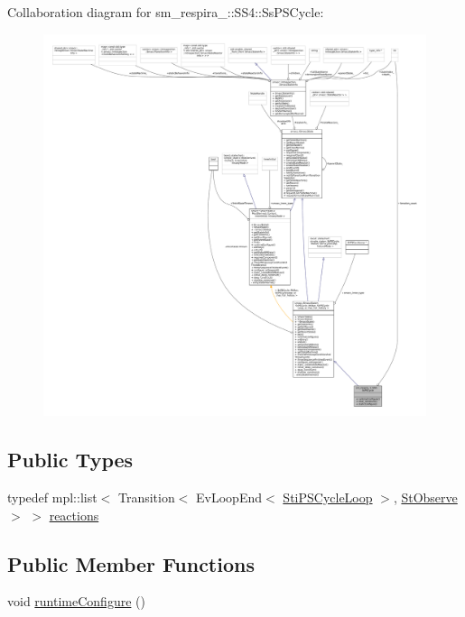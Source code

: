 Collaboration diagram for sm\+\_\+respira\+\_\+:\+:S\+S4\+:\+:Ss\+P\+S\+Cycle\+:
\nopagebreak
\begin{figure}[H]
\begin{center}
\leavevmode
\includegraphics[width=350pt]{structsm__respira__1_1_1SS4_1_1SsPSCycle__coll__graph}
\end{center}
\end{figure}
\subsection*{Public Types}
\begin{DoxyCompactItemize}
\item 
typedef mpl\+::list$<$ Transition$<$ Ev\+Loop\+End$<$ \hyperlink{structsm__respira__1_1_1ps__cycle__inner__states_1_1StiPSCycleLoop}{Sti\+P\+S\+Cycle\+Loop} $>$, \hyperlink{structsm__respira__1_1_1StObserve}{St\+Observe} $>$ $>$ \hyperlink{structsm__respira__1_1_1SS4_1_1SsPSCycle_aad6397ffff7eef88efc3824b91423462}{reactions}
\end{DoxyCompactItemize}
\subsection*{Public Member Functions}
\begin{DoxyCompactItemize}
\item 
void \hyperlink{structsm__respira__1_1_1SS4_1_1SsPSCycle_a0604517fbc101096b2ff8b20ed9b4f80}{runtime\+Configure} ()
\end{DoxyCompactItemize}
